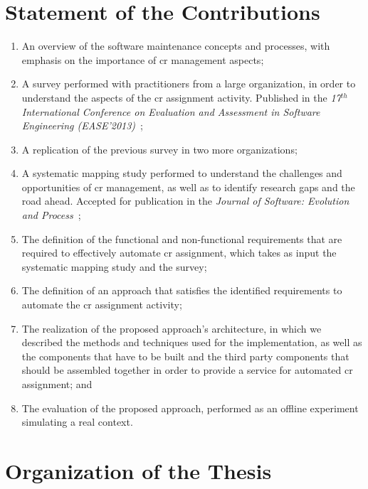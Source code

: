 \section{Statement of the Contributions}
\lipsum[6-7]

\begin{enumerate}
  \item An overview of the software maintenance concepts and processes, with
  emphasis on the importance of \ac{cr} management aspects; 
  \item A survey performed with practitioners from a large organization, in
  order to understand the aspects of the \ac{cr} assignment
  activity. Published in the \emph{17$^{th}$ International Conference on Evaluation
  and Assessment in Software Engineering (EASE'2013)}~\citep{CavalcantiEASE2013};
  \item A replication of the previous survey in two more organizations;
  \item A systematic mapping study performed to understand the challenges and
  opportunities of \ac{cr} management, as well as to identify research gaps and
  the road ahead. Accepted for publication in the
  \emph{Journal of Software: Evolution and Process}~\citep{CavalcantiJSEP2013};
  \item The definition of the functional and non-functional requirements that
  are required to effectively automate \ac{cr} assignment, which takes as input
  the systematic mapping study and the survey;
  \item The definition of an approach that satisfies the
  identified requirements to automate the \ac{cr} assignment activity;
  \item The realization of the proposed approach's architecture, in which we
  described the methods and techniques used for the implementation, as well as the
  components that have to be built and the third party components that should be
  assembled together in order to provide a service for automated \ac{cr}
  assignment; and
  \item The evaluation of the proposed approach, performed as an offline
  experiment simulating a real context.
\end{enumerate}

\section{Organization of the Thesis}

\lipsum[5-10]

